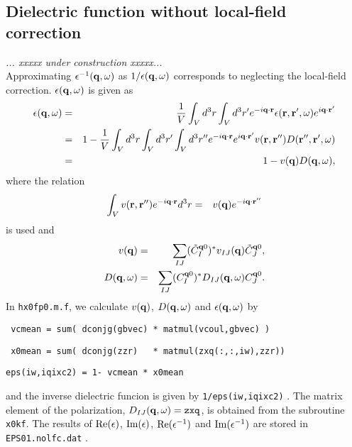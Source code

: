 \documentclass[a4paper,10pt,fleqn]{article}
\def\underconstruction{{\it... xxxxx under construction xxxxx...\\}}
\begin{document}
\subsection{Dielectric function without local-field correction}
\underconstruction
Approximating $\epsilon^{-1}({\bf q},\omega)$ as $1/\epsilon({\bf q},\omega)$
corresponds to neglecting the local-field correction.
$\epsilon({\bf q},\omega)$ is given as 
\begin{eqnarray}
  \epsilon({\bf q},\omega) 
 &=& \frac{1}{V}
  \int_V d^3r \int_V d^3r' e^{-i{\bf q}\cdot{\bf r}}
  \epsilon({\bf r},{\bf r}',\omega)e^{i{\bf q}\cdot{\bf r}'} \nonumber \\
 &=& 1 - \frac{1}{V} \int_V d^3r \int_V d^3r' \int_V d^3r''
  e^{-i{\bf q}\cdot{\bf r}} e^{i{\bf q}\cdot{\bf r}'} 
  v({\bf r,r''})D({\bf r'',r'},\omega)  \nonumber \\
 &=& 1 - v({\bf q})D({\bf q},\omega),
           \label{eq. eps1}
\end{eqnarray}
where the relation
\begin{eqnarray}
   \int_V v({\bf r},{\bf r}'')e^{-i{\bf q}\cdot{\bf r}}d^3r 
  &=& v({\bf q})e^{-i{\bf q \cdot r''}}
\end{eqnarray}
is used and 
\begin{eqnarray}
   v({\bf q}) &=& \sum_{IJ}( \tilde{C}^{{\bf q}0}_I )^*
                v_{IJ}({\bf q})\tilde{C}^{{\bf q}0}_J , \\
   D({\bf q},\omega) 
              &=& \sum_{IJ}( C^{{\bf q}0}_I )^*
                D_{IJ}({\bf q},\omega) C^{{\bf q}0}_J.     
\end{eqnarray}
In \verb|hx0fp0.m.f|, we calculate $v({\bf q})$, $D({\bf q},\omega)$ 
and $\epsilon({\bf q},\omega)$ by
\begin{center}
    \verb| vcmean = sum( dconjg(gbvec) * matmul(vcoul,gbvec) )   |
    
    \verb| x0mean = sum( dconjg(zzr)   * matmul(zxq(:,:,iw),zzr))|
    
    \verb|eps(iw,iqixc2) = 1- vcmean * x0mean|
\end{center}
and the inverse dielectric funcion is given by
\verb|1/eps(iw,iqixc2)| .  
The matrix element of the polarization, $D_{IJ}({\bf q},\omega)=\verb|zxq|$,
is obtained from the subroutine \verb|x0kf|.
The results of ${\rm Re}(\epsilon)$, ${\rm Im}(\epsilon)$, 
${\rm Re}(\epsilon^{-1})$
and ${\rm Im}(\epsilon^{-1})$ are stored in \verb|EPS01.nolfc.dat| .
\end{document}
